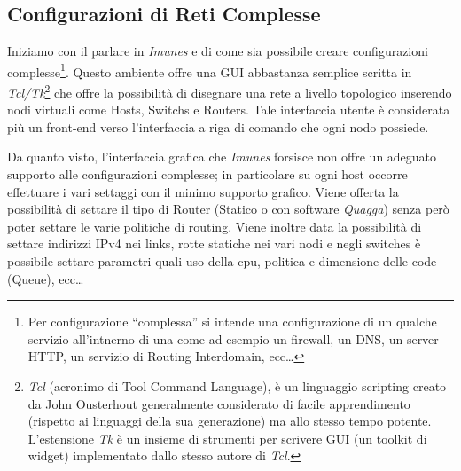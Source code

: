 \subsection{Configurazioni di Reti Complesse}\label{subsection:ccrc}
Iniziamo con il parlare in \emph{Imunes} e di come sia possibile creare configurazioni complesse\footnote{Per configurazione ``complessa'' si intende una configurazione di un qualche servizio all'intnerno di una \virtualmachine come ad esempio un firewall, un DNS, un server HTTP, un servizio di Routing Interdomain, ecc\ldots}.
Questo ambiente offre una GUI abbastanza semplice scritta in \emph{Tcl/Tk}\footnote{\emph{Tcl} (acronimo di Tool Command Language), è un linguaggio scripting creato da John Ousterhout generalmente considerato di facile apprendimento (rispetto ai linguaggi della sua generazione) ma allo stesso tempo potente. L'estensione \emph{Tk} è un insieme di strumenti per scrivere GUI (un toolkit di widget) implementato dallo stesso autore di \emph{Tcl}.} che offre la possibilità di disegnare una rete a livello topologico inserendo nodi virtuali come Hosts, Switchs e Routers. Tale interfaccia utente è considerata più un front-end verso l'interfaccia a riga di comando che ogni nodo possiede.

Da quanto visto\cite{IMUNESHOWTO}, l'interfaccia grafica che \emph{Imunes} forsisce non offre un adeguato supporto alle configurazioni complesse; in particolare su ogni host occorre effettuare i vari settaggi con il minimo supporto grafico. Viene offerta la possibilità di settare il tipo di Router (Statico o con software \emph{Quagga}) senza però poter settare le varie politiche di routing. Viene inoltre data la possibilità di settare indirizzi IPv4 nei links, rotte statiche nei vari nodi e negli switches è possibile settare parametri quali uso della cpu, politica e dimensione delle code (Queue), ecc\ldots

